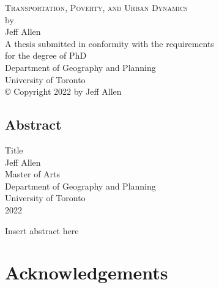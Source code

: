 \documentclass[11 pt, letterpaper]{report}
\begin{document}
	
{\begin{titlepage}
		\large
		\singlespacing
		\begin{center}
			\mbox{}
			\vfill
			\textsc{Transportation, Poverty, and Urban Dynamics}\\
			\vfill
			by \\
			\vfill
			{Jeff Allen}\\
			\vfill
			\vfill
			A thesis submitted in conformity with the requirements \\
			for the degree of PhD  \\
			Department of Geography and Planning \\
			University of Toronto \\
			\vfill
			{\copyright} Copyright 2022 by Jeff Allen\\
			\vspace{.01\textheight}
			\mbox{}
		\end{center}
		\setcounter{page}{1}
	\end{titlepage}
	\setcounter{page}{2}}






\renewcommand{\thepage}{\roman{page}}%

\newpage



\begin{center}
\section*{Abstract}
	\singlespacing
	{Title}\\[2ex]
	{Jeff Allen}\\
	{Master of Arts}\\
	Department of Geography and Planning\\
	University of Toronto\\
	{2022}\\
\end{center}
Insert abstract here



\vspace{12mm}



\newpage


\chapter*{\Large{Acknowledgements}}
\end{document}
